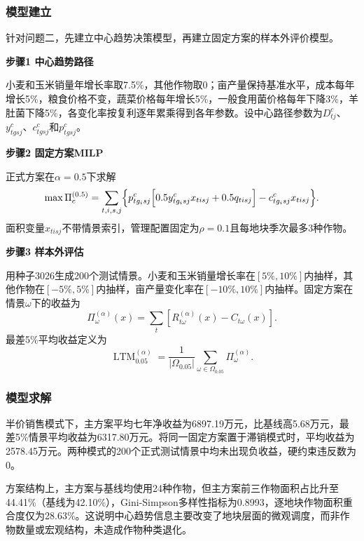 \subsubsection{模型建立}

针对问题二，先建立中心趋势决策模型，再建立固定方案的样本外评价模型。

\textbf{步骤1 中心趋势路径}

小麦和玉米销量年增长率取7.5\%，其他作物取0；亩产量保持基准水平，成本每年增长5\%，粮食价格不变，蔬菜价格每年增长5\%，一般食用菌价格每年下降3\%，羊肚菌下降5\%，各变化率按复利逐年累乘得到各年参数。设中心路径参数为$D^c_{tj}$、$y^c_{tgsj}$、$c^c_{tgsj}$和$p^c_{tgsj}$。

\textbf{步骤2 固定方案MILP}

正式方案在$\alpha=0.5$下求解
\begin{equation}
\max \Pi_c^{(0.5)}=\sum_{t,i,s,j}\Bigl\{p^c_{tg_i s j}\Bigl[0.5y^c_{tg_i s j}x_{tisj}+0.5q_{tisj}\Bigr]-c^c_{tg_i s j}x_{tisj}\Bigr\}.
\end{equation}
面积变量$x_{tisj}$不带情景索引，管理配置固定为$\rho=0.1$且每地块季次最多3种作物。

\textbf{步骤3 样本外评估}

用种子3026生成200个测试情景。小麦和玉米销量增长率在$[5\%,10\%]$内抽样，其他作物在$[-5\%,5\%]$内抽样，亩产量变化率在$[-10\%,10\%]$内抽样。固定方案在情景$\omega$下的收益为
\begin{equation}
\Pi_{\omega}^{(\alpha)}(x)=\sum_t\left[R_{t\omega}^{(\alpha)}(x)-C_{t\omega}(x)\right].
\end{equation}
最差5\%平均收益定义为
\begin{equation}
\operatorname{LTM}_{0.05}^{(\alpha)}=\frac{1}{|\Omega_{0.05}|}\sum_{\omega\in\Omega_{0.05}}\Pi_{\omega}^{(\alpha)}.
\end{equation}

\subsubsection{模型求解}

半价销售模式下，主方案平均七年净收益为6897.19万元，比基线高5.68万元，最差5\%情景平均收益为6317.80万元。将同一固定方案置于滞销模式时，平均收益为2578.45万元。两种模式的200个正式测试情景中均未出现负收益，硬约束违反数为0。

方案结构上，主方案与基线均使用24种作物，但主方案前三作物面积占比升至44.41\%（基线为42.10\%），Gini-Simpson多样性指标为0.8993，逐地块作物面积重合度仅为28.63\%。这说明中心趋势信息主要改变了地块层面的微观调度，而非作物数量或宏观结构，未造成作物种类退化。

